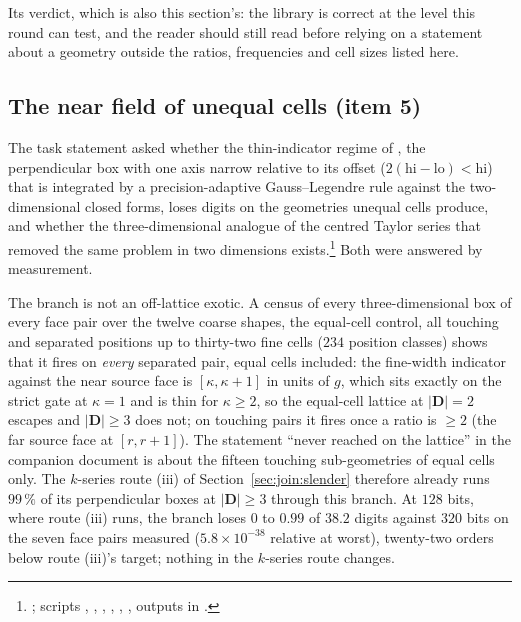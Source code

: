 Its verdict, which is also this section's: the library is correct at the level this round
can test, and the reader should still read  before relying on a statement
about a geometry outside the ratios, frequencies and cell sizes listed here.

\subsection{The near field of unequal cells (item 5)}
\label{sec:xs:near}

The task statement asked whether the thin-indicator regime of , the
perpendicular box with one axis narrow relative to its offset ($2(\mathrm{hi}-\mathrm{lo})<\mathrm{hi}$)
that is integrated by a precision-adaptive Gauss--Legendre rule against the two-dimensional
closed forms, loses digits on the geometries unequal cells produce, and whether the
three-dimensional analogue of the centred Taylor series that removed the same problem in two
dimensions exists.\footnote{; scripts
, , , ,
, , outputs in .} Both were
answered by measurement.

The branch is not an off-lattice exotic. A census of every three-dimensional box of every
face pair over the twelve coarse shapes, the equal-cell control, all touching and separated
positions up to thirty-two fine cells ($234$ position classes) shows that it fires on
\emph{every} separated pair, equal cells included: the fine-width indicator against the near
source face is $[\kappa,\kappa+1]$ in units of $g$, which sits exactly on the strict gate at
$\kappa = 1$ and is thin for $\kappa\ge2$, so the equal-cell lattice at $|\mathbf{D}| = 2$
escapes and $|\mathbf{D}|\ge3$ does not; on touching pairs it fires once a ratio is $\ge2$
(the far source face at $[r,r+1]$). The statement ``never reached on the lattice'' in the
companion document is about the fifteen touching sub-geometries of equal cells only. The
$k$-series route (iii) of Section~\ref{sec:join:slender} therefore already runs $99\,\%$ of
its perpendicular boxes at $|\mathbf{D}|\ge3$ through this branch. At $128$ bits, where
route (iii) runs, the branch loses $0$ to $0.99$ of $38.2$ digits against $320$ bits on the
seven face pairs measured ($5.8\times10^{-38}$ relative at worst), twenty-two orders below
route (iii)'s target; nothing in the $k$-series route changes.

